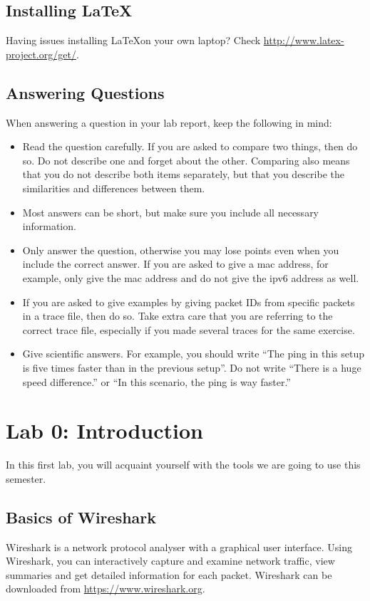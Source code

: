 \subsection*{Installing \LaTeX}

Having issues installing \LaTeX on your own laptop? Check \url{http://www.latex-project.org/get/}.

\subsection*{Answering Questions}
When answering a question in your lab report, keep the following in mind:
\begin{itemize}
	\item Read the question carefully. If you are asked to compare two things, then do so. Do not describe one and forget about the other. Comparing also means that you do not describe both items separately, but that you describe the similarities and differences between them.
	\item Most answers can be short, but make sure you include all necessary information.
	\item Only answer the question, otherwise you may lose points even when you include the correct answer. If you are asked to give a \ac{mac} address, for example, only give the \ac{mac} address and do not give the \ac{ipv6} address as well.
	\item If you are asked to give examples by giving packet IDs from specific packets in a trace file, then do so. Take extra care that you are referring to the correct trace file, especially if you made several traces for the same exercise.
	\item Give scientific answers. For example, you should write ``The ping in this setup is five times faster than in the previous setup''. Do not write ``There is a huge speed difference.'' or ``In this scenario, the ping is way faster.''
\end{itemize}

\newpage
\section{Lab 0: Introduction}\label{sec:lab0}
In this first lab, you will acquaint yourself with the tools we are going to use this semester.

\subsection{Basics of Wireshark}
Wireshark is a network protocol analyser with a graphical user interface. Using Wireshark, you can interactively capture and examine network traffic, view summaries and get detailed information for each packet. Wireshark can be downloaded from \url{https://www.wireshark.org}.


